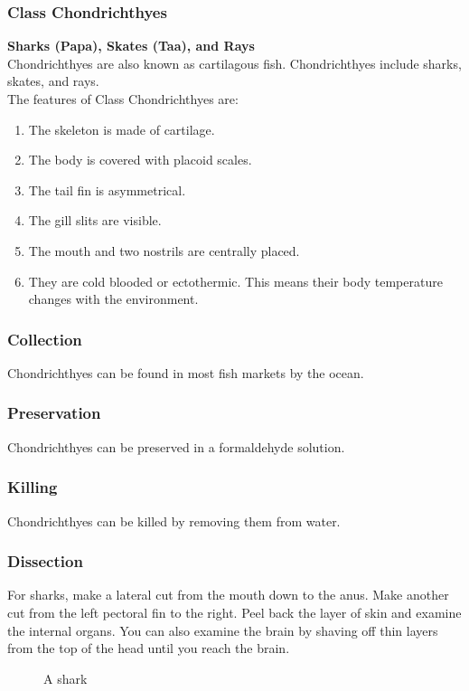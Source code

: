 \subsubsection{Class Chondrichthyes}
\textbf{Sharks (Papa), Skates (Taa), and Rays}\\
Chondrichthyes are also known as cartilagous fish. Chondrichthyes include sharks, skates, and rays.\\
The features of Class Chondrichthyes are:
\begin{enumerate}
\item{The skeleton is made of cartilage.}
\item{The body is covered with placoid scales.}
\item{The tail fin is asymmetrical.}
\item{The gill slits are visible.}
\item{The mouth and two nostrils are centrally placed.}
\item{They are cold blooded or ectothermic. This means their body temperature changes with the environment.}
\end{enumerate}

\subsubsection{Collection}
Chondrichthyes can be found in most fish markets by the ocean. 

\subsubsection{Preservation} 
Chondrichthyes can be preserved in a formaldehyde solution.

\subsubsection{Killing}
Chondrichthyes can be killed by removing them from water. 

\subsubsection{Dissection}
For sharks, make a lateral cut from the mouth down to the anus. Make another cut from the left pectoral fin to the right. Peel back the layer of skin and examine the internal organs. You can also examine the brain by shaving off thin layers from the top of the head until you reach the brain.

\begin{figure}[h]
\begin{center}
\def\svgwidth{6cm}

\caption{A shark}
\label{fig:shark}
\end{center}
\end{figure}
